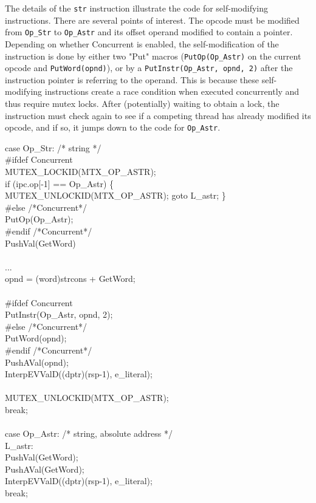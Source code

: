 The details of the \texttt{str} instruction illustrate the code for
self-modifying instructions. There are several points of interest. The
opcode must be modified from \texttt{Op\_Str} to \texttt{Op\_Astr} and
its offset operand modified to contain a pointer.  Depending on
whether Concurrent is enabled, the self-modification of the
instruction is done by either two "Put" macros
(\texttt{PutOp(Op\_Astr)} on the current opcode and
\texttt{PutWord(opnd)}), or by a \texttt{PutInstr(Op\_Astr, opnd, 2)}
after the instruction pointer is referring to the operand.  This is
because these self-modifying instructions create a race condition when
executed concurrently and thus require mutex locks.  After
(potentially) waiting to obtain a lock, the instruction must check
again to see if a competing thread has already modified its opcode,
and if so, it jumps down to the code for \texttt{Op\_Astr}.


\begin{iconcode}
\>\>\>	 case Op\_Str:		/* string */ \\
\#ifdef Concurrent \\
\>\>\>\>    MUTEX\_LOCKID(MTX\_OP\_ASTR); \\
\>\>\>\>    if (ipc.op[-1] == Op\_Astr) \{ \\
\>\>\>\>\>     MUTEX\_UNLOCKID(MTX\_OP\_ASTR); goto L\_astr; \} \\
\#else					/*Concurrent*/ \\
\>\>\>\>    PutOp(Op\_Astr); \\
\#endif					/*Concurrent*/ \\
\>\>\>\>    PushVal(GetWord) \\
\ \\
\>\>\>\>	... \\
\>\>\>\>       opnd = (word)strcons + GetWord; \\
\ \\
\#ifdef Concurrent \\
\>\>\>\>    PutInstr(Op\_Astr, opnd, 2); \\
\#else					/*Concurrent*/ \\
\>\>\>\>    PutWord(opnd); \\
\#endif					/*Concurrent*/ \\
\>\>\>\>    PushAVal(opnd); \\
\>\>\>\>    InterpEVValD((dptr)(rsp-1), e\_literal); \\
\ \\
\>\>\>\>    MUTEX\_UNLOCKID(MTX\_OP\_ASTR); \\
\>\>\>\>    break; \\
\ \\
\>\>\>	 case Op\_Astr:		/* string, absolute address */ \\
L\_astr: \\
\>\>\>\>    PushVal(GetWord); \\
\>\>\>\>    PushAVal(GetWord); \\
\>\>\>\>    InterpEVValD((dptr)(rsp-1), e\_literal); \\
\>\>\>\>    break;
\end{iconcode}


